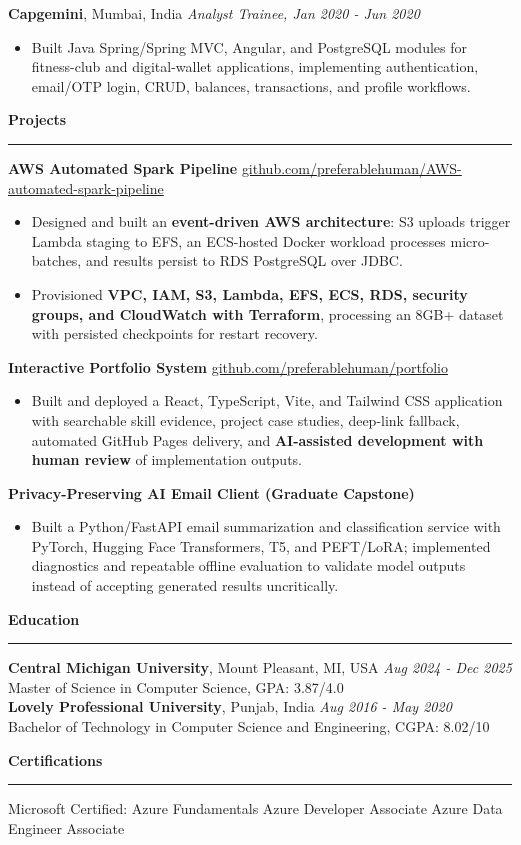 \documentclass[11pt,letterpaper]{article}
\newcommand{\ressection}[1]{\Needspace{6\baselineskip}\vspace{8pt}\par\textbf{#1}\par\vspace{2pt}\hrule\vspace{5pt}}
\begin{document}
\textbf{Capgemini}, Mumbai, India \hfill \textit{Analyst Trainee, Jan 2020 - Jun 2020}
\begin{itemize}
  \item Built Java Spring/Spring MVC, Angular, and PostgreSQL modules for fitness-club and digital-wallet applications, implementing authentication, email/OTP login, CRUD, balances, transactions, and profile workflows.
\end{itemize}

\ressection{Projects}
\textbf{AWS Automated Spark Pipeline} \hfill \href{https://github.com/preferablehuman/AWS-automated-spark-pipeline}{github.com/preferablehuman/AWS-automated-spark-pipeline}
\begin{itemize}
  \item Designed and built an \textbf{event-driven AWS architecture}: S3 uploads trigger Lambda staging to EFS, an ECS-hosted Docker workload processes micro-batches, and results persist to RDS PostgreSQL over JDBC.
  \item Provisioned \textbf{VPC, IAM, S3, Lambda, EFS, ECS, RDS, security groups, and CloudWatch with Terraform}, processing an 8GB+ dataset with persisted checkpoints for restart recovery.
\end{itemize}
\vspace{2pt}
\textbf{Interactive Portfolio System} \hfill \href{https://github.com/preferablehuman/portfolio}{github.com/preferablehuman/portfolio}
\begin{itemize}
  \item Built and deployed a React, TypeScript, Vite, and Tailwind CSS application with searchable skill evidence, project case studies, deep-link fallback, automated GitHub Pages delivery, and \textbf{AI-assisted development with human review} of implementation outputs.
\end{itemize}
\vspace{2pt}
\textbf{Privacy-Preserving AI Email Client (Graduate Capstone)}
\begin{itemize}
  \item Built a Python/FastAPI email summarization and classification service with PyTorch, Hugging Face Transformers, T5, and PEFT/LoRA; implemented diagnostics and repeatable offline evaluation to validate model outputs instead of accepting generated results uncritically.
\end{itemize}

\ressection{Education}
\textbf{Central Michigan University}, Mount Pleasant, MI, USA \hfill \textit{Aug 2024 - Dec 2025}\\
Master of Science in Computer Science, GPA: 3.87/4.0\\
\textbf{Lovely Professional University}, Punjab, India \hfill \textit{Aug 2016 - May 2020}\\
Bachelor of Technology in Computer Science and Engineering, CGPA: 8.02/10

\ressection{Certifications}
Microsoft Certified: Azure Fundamentals \textbar{} Azure Developer Associate \textbar{} Azure Data Engineer Associate
\end{document}
